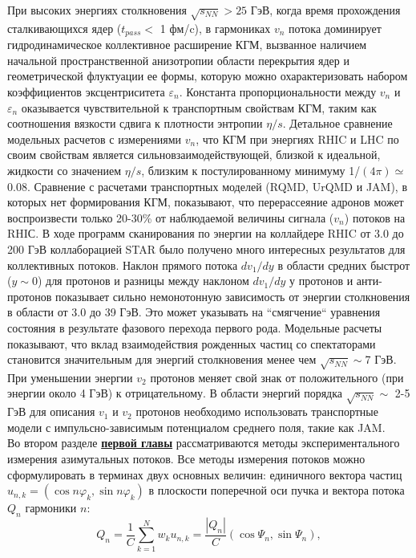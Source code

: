 При высоких энергиях столкновения $\sqrt{s_{NN}} > 25$ ГэВ, когда время прохождения сталкивающихся ядер
($t_{pass}<$ 1 фм/c), в гармониках $v_n$ потока доминирует гидродинамическое
коллективное расширение КГМ, вызванное наличием начальной пространственной анизотропии области перекрытия
ядер и геометрической флуктуации ее формы, которую можно охарактеризовать набором коэффициентов
эксцентриситета $\varepsilon_n$. Константа пропорциональности между $v_n$  и $\varepsilon_n$ оказывается чувствительной
к транспортным свойствам КГМ, таким как соотношения вязкости сдвига к плотности энтропии $\eta/s$.
Детальное сравнение модельных расчетов с измерениями $v_n$, что КГМ при энергиях
RHIC и LHC по своим свойствам является сильновзаимодействующей, близкой к идеальной, жидкости
со значением $\eta/s$, близким к постулированному минимуму 1/$(4\pi) \simeq$ 0.08.
Сравнение с расчетами транспортных моделей (RQMD, UrQMD и JAM), в которых нет
формирования КГМ, показывают, что перерассеяние адронов может воспроизвести только 20-30\%
от наблюдаемой величины сигнала  ($v_n$) потоков на RHIС.
В ходе программ сканирования по энергии на коллайдере RHIC от
3.0 до 200 ГэВ коллаборацией STAR было получено много интересных результатов для коллективных
потоков.
Наклон прямого потока $dv_1/dy$ в области средних быстрот ($y \sim 0$) для протонов и разницы
между наклоном $dv_1/dy$ у протонов и анти-протонов показывает сильно немонотонную зависимость от
энергии столкновения в области от 3.0 до 39 ГэВ. Это может указывать на “смягчение“
уравнения состояния в результате фазового перехода первого рода. Модельные расчеты показывают, что вклад
взаимодействия рожденных частиц со спектаторами становится значительным для энергий столкновения
менее чем $\sqrt{s_{NN}}\sim$7 ГэВ. При уменьшении энергии $v_2$ протонов меняет свой знак от положительного
(при энергии около 4 ГэВ) к отрицательному. В области энергий порядка $\sqrt{s_{NN}}\sim$ 2-5 ГэВ для описания
$v_1$ и $v_2$ протонов необходимо использовать   транспортные модели с импульсно-зависимым потенциалом среднего поля, такие как JAM.\\
Во втором разделе \underline{\textbf{первой главы}}  рассматриваются методы экспериментального измерения азимутальных потоков. 
Все методы измерения потоков можно
сформулировать в терминах двух основных величин:  единичного вектора частиц $u_{n,k} = ( \cos n\varphi_k, \sin n\varphi_k )$ в плоскости поперечной оси пучка и
вектора потока $Q_n$ гармоники $n$:
\begin{equation}
    Q_n = \frac{1}{C} \sum_{k=1}^{N} w_k u_{n,k} = \frac{|Q_n|}{C} (\cos{\Psi_n}, \sin{\Psi_n}) ,
\end{equation}
